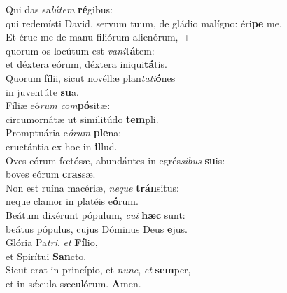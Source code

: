 \evenverse Qui das sa\textit{lú}\textit{tem} \textbf{ré}gibus:~\*\\
\evenverse qui redemísti David, servum tuum, de gládio malígno: éri\textbf{pe} me.\\
\oddverse Et érue me de manu filiórum alienórum,~+\\
\oddverse  quorum os locútum est \textit{va}\textit{ni}\textbf{tá}tem:~\*\\
\oddverse et déxtera eórum, déxtera iniqui\textbf{tá}tis.\\
\evenverse Quorum fílii, sicut novéllæ plan\textit{ta}\textit{ti}\textbf{ó}nes~\*\\
\evenverse in juventúte \textbf{su}a.\\
\oddverse Fíliæ eó\textit{rum} \textit{com}\textbf{pó}sitæ:~\*\\
\oddverse circumornátæ ut similitúdo \textbf{tem}pli.\\
\evenverse Promptuária e\textit{ó}\textit{rum} \textbf{ple}na:~\*\\
\evenverse eructántia ex hoc in \textbf{il}lud.\\
\oddverse Oves eórum fœtósæ, abundántes in egrés\textit{si}\textit{bus} \textbf{su}is:~\*\\
\oddverse boves eórum \textbf{cras}sæ.\\
\evenverse Non est ruína macériæ, \textit{ne}\textit{que} \textbf{trán}situs:~\*\\
\evenverse neque clamor in platéis e\textbf{ó}rum.\\
\oddverse Beátum dixérunt pópulum, \textit{cu}\textit{i} \textbf{hæc} sunt:~\*\\
\oddverse beátus pópulus, cujus Dóminus Deus \textbf{e}jus.\\
\evenverse Glória Pa\textit{tri}, \textit{et} \textbf{Fí}lio,~\*\\
\evenverse et Spirítui \textbf{San}cto.\\
\oddverse Sicut erat in princípio, et \textit{nunc}, \textit{et} \textbf{sem}per,~\*\\
\oddverse et in sǽcula sæculórum. \textbf{A}men.\\
